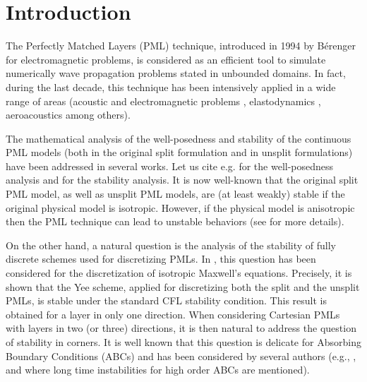 \documentclass[a4paper]{article}
\begin{document}



\makeRR 



\section{Introduction}
The Perfectly Matched Layers (PML) technique, introduced in 
1994 by B\'erenger \cite{Ber94} for electromagnetic problems, is
considered as an efficient tool to simulate numerically wave propagation
problems stated in unbounded domains. In fact, during the last decade, 
this technique has been intensively applied in a wide range of areas
(acoustic and electromagnetic problems 
\cite{Rappaport:1995,Zhao:1996,pezhca98,Petropoulos:2000,
Collino:1998:1,Collino:1998:2},
elastodynamics
\cite{Col-Tso2,BFJ:2003,BasuChopra:pml-elas:04,ApKr06},
aeroacoustics
\cite{Hesthaven:1998,Hu:1996,Hu:2001,DJ-euler:03,Hag-pml03,
ApKr-pmleuler03,Nataf-JCP05,appelo2007pml}
among  others).

The mathematical analysis of the 
well-posedness and  stability of the continuous PML models (both 
in the original split formulation and in unsplit formulations) 
have been addressed in several works. Let us cite e.g. 
\cite{ab-got:97,Abarbanel:1999,rahm:phd,LVM:02} 
for the  well-posedness analysis and 
\cite{BJ:02,Hu:2001,BFJ:2003,BPG:04} for the  stability analysis.
It is now well-known that the original split  PML model,
as well as unsplit PML models, are (at least weakly) stable if
the original physical model is isotropic.
However, if the physical model is anisotropic then
the PML technique can lead to  unstable behaviors
(see \cite{BFJ:2003} for more details).

On the other hand, a natural question is the analysis of the stability of 
fully discrete schemes used for discretizing PMLs. In \cite{BJ:02}, 
this question has been considered for the discretization of isotropic 
Maxwell's equations. Precisely, it is shown that the Yee
scheme, applied for discretizing both  the  split and the unsplit PMLs, 
is stable under the standard CFL stability condition. 
This result is obtained for a layer in only one direction. When
considering Cartesian PMLs with layers in two (or three) directions, 
it is then natural to address the question of stability in corners. 
It is well known that this question is delicate for Absorbing Boundary 
Conditions (ABCs) and has been considered by several authors 
(e.g., \cite{Engq-Majd-77,Ramahi99}, and \cite{Giv-Hag-Pat:06} where 
long time instabilities for high order ABCs are mentioned).  
\end{document}
